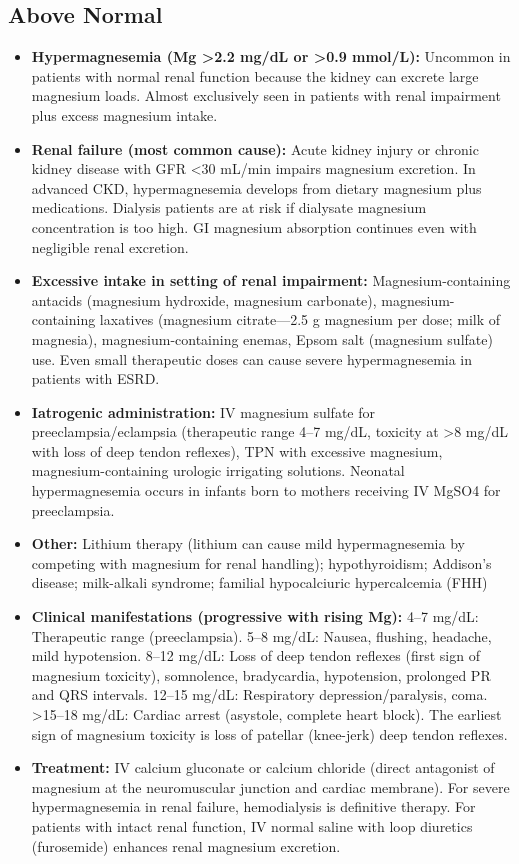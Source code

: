 \subsection*{Above Normal}
\begin{itemize}
  \item \textbf{Hypermagnesemia (Mg >2.2 mg/dL or >0.9 mmol/L):} Uncommon in patients with normal renal function because the kidney can excrete large magnesium loads. Almost exclusively seen in patients with renal impairment plus excess magnesium intake.
  \item \textbf{Renal failure (most common cause):} Acute kidney injury or chronic kidney disease with GFR <30 mL/min impairs magnesium excretion. In advanced CKD, hypermagnesemia develops from dietary magnesium plus medications. Dialysis patients are at risk if dialysate magnesium concentration is too high. GI magnesium absorption continues even with negligible renal excretion.
  \item \textbf{Excessive intake in setting of renal impairment:} Magnesium-containing antacids (magnesium hydroxide, magnesium carbonate), magnesium-containing laxatives (magnesium citrate---2.5 g magnesium per dose; milk of magnesia), magnesium-containing enemas, Epsom salt (magnesium sulfate) use. Even small therapeutic doses can cause severe hypermagnesemia in patients with ESRD.
  \item \textbf{Iatrogenic administration:} IV magnesium sulfate for preeclampsia/eclampsia (therapeutic range 4--7 mg/dL, toxicity at >8 mg/dL with loss of deep tendon reflexes), TPN with excessive magnesium, magnesium-containing urologic irrigating solutions. Neonatal hypermagnesemia occurs in infants born to mothers receiving IV MgSO4 for preeclampsia.
  \item \textbf{Other:} Lithium therapy (lithium can cause mild hypermagnesemia by competing with magnesium for renal handling); hypothyroidism; Addison's disease; milk-alkali syndrome; familial hypocalciuric hypercalcemia (FHH)
  \item \textbf{Clinical manifestations (progressive with rising Mg):} 4--7 mg/dL: Therapeutic range (preeclampsia). 5--8 mg/dL: Nausea, flushing, headache, mild hypotension. 8--12 mg/dL: Loss of deep tendon reflexes (first sign of magnesium toxicity), somnolence, bradycardia, hypotension, prolonged PR and QRS intervals. 12--15 mg/dL: Respiratory depression/paralysis, coma. >15--18 mg/dL: Cardiac arrest (asystole, complete heart block). The earliest sign of magnesium toxicity is loss of patellar (knee-jerk) deep tendon reflexes.
  \item \textbf{Treatment:} IV calcium gluconate or calcium chloride (direct antagonist of magnesium at the neuromuscular junction and cardiac membrane). For severe hypermagnesemia in renal failure, hemodialysis is definitive therapy. For patients with intact renal function, IV normal saline with loop diuretics (furosemide) enhances renal magnesium excretion.
\end{itemize}

